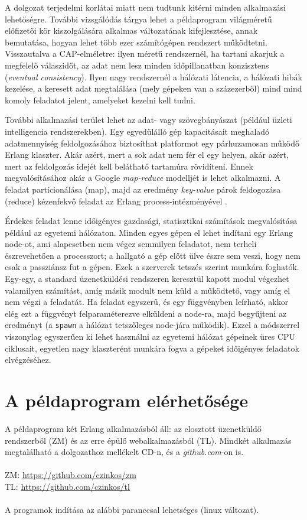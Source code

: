 \documentclass[12pt, a4paper, oneside]{book}
\begin{document}
A dolgozat terjedelmi korlátai miatt nem tudtunk kitérni minden alkalmazási
lehetőségre. További vizsgálódás tárgya lehet a példaprogram világméretű
előfizetői kör kiszolgálására alkalmas változatának kifejlesztése, annak
bemutatása, hogyan lehet több ezer számítógépen rendszert működtetni. 
Visszautalva a CAP-elméletre: ilyen méretű rendszernél, ha tartani akarjuk a
megfelelő válaszidőt, az adat nem lesz minden időpillanatban konzisztens
(\emph{eventual consistency}). Ilyen nagy rendszernél a hálózati látencia, a
hálózati hibák kezelése, a keresett adat megtalálása (mely gépeken van a
százezerből) mind mind komoly feladatot jelent, amelyeket kezelni kell tudni.

További alkalmazási terület lehet az adat- vagy szövegbányászat
(például üzleti intelligencia rendszerekben). Egy egyedülálló gép kapacitásait
meghaladó adatmennyiség feldolgozásához biztosíthat platformot egy párhuzamosan
működő Erlang klaszter. Akár azért, mert a sok adat nem fér el egy helyen, akár
azért, mert az feldolgozás idejét kell belátható tartamúra rövidíteni. Ennek
megvalósításához akár a Google \emph{map-reduce} modelljét is lehet alkalmazni. A
feladat partícionálása (map), majd az eredmény \emph{key-value} párok
feldogozása (reduce) kézenfekvő feladat az Erlang process-intézményével
\citep{MapReduce}.

Érdekes feladat lenne időigényes gazdasági, statisztikai számítások
megvalósítása például az egyetemi hálózaton. Minden egyes gépen el lehet
indítani egy Erlang node-ot, ami alapesetben nem végez semmilyen
feladatot, nem terheli észrevehetően a processzort; a hallgató a gép előtt ülve
észre sem veszi, hogy nem csak a passziánsz fut a gépen. Ezek a 
szerverek tetszés szerint munkára foghatók. Egy-egy, a standard üzenetküldési
rendszeren keresztül kapott modul végezhet valamilyen számítást, amíg másik
modult nem küld a működtető, vagy amíg el nem végzi a feladatát. Ha feladat
egyszerű, és egy függvényben leírható, akkor elég ezt a függvényt
felparaméterezve elküldeni a node-ra, majd begyűjteni az eredményt
(a \texttt{spawn} a hálózat tetszőleges node-jára működik). Ezzel a
módszerrel viszonylag egyszerűen ki lehet használni az egyetemi
hálózat gépeinek üres CPU ciklusait, egyetlen nagy klaszterént munkára fogva a
gépeket időigényes feladatok elvégzéséhez.

\appendix
\chapter{A példaprogram elérhetősége}
A példaprogram két Erlang alkalmazásból áll: az elosztott üzenetküldő
rendszerből (ZM) és az erre épülő webalkalmazásból (TL). Mindkét alkalmazás
megtalálható a dolgozathoz mellékelt CD-n, és a \emph{github.com}-on is.
\\
\\
\noindent ZM: \url{https://github.com/czinkos/zm}\\
TL: \url{https://github.com/czinkos/tl}
\\
\\
\noindent A programok indítása az alábbi paranccsal lehetséges (linux változat).
\end{document}
